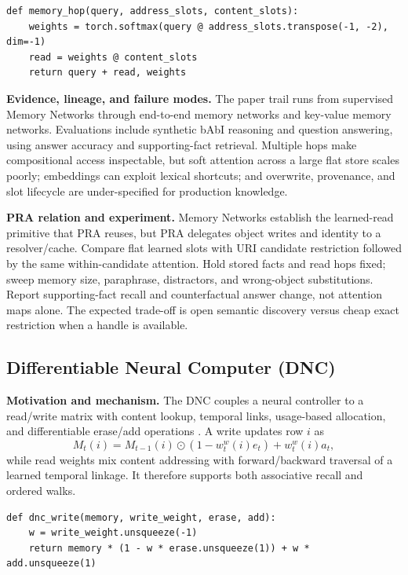 \begin{lstlisting}[caption={One differentiable memory hop}]
def memory_hop(query, address_slots, content_slots):
    weights = torch.softmax(query @ address_slots.transpose(-1, -2), dim=-1)
    read = weights @ content_slots
    return query + read, weights
\end{lstlisting}

\textbf{Evidence, lineage, and failure modes.} The paper trail runs from supervised Memory
Networks through end-to-end memory networks and key-value memory networks.  Evaluations
include synthetic bAbI reasoning and question answering, using answer accuracy and
supporting-fact retrieval.  Multiple hops make compositional access inspectable, but soft
attention across a large flat store scales poorly; embeddings can exploit lexical shortcuts;
and overwrite, provenance, and slot lifecycle are under-specified for production knowledge.

\textbf{PRA relation and experiment.} Memory Networks establish the learned-read primitive
that PRA reuses, but PRA delegates object writes and identity to a resolver/cache.  Compare
flat learned slots with URI candidate restriction followed by the same within-candidate
attention.  Hold stored facts and read hops fixed; sweep memory size, paraphrase, distractors,
and wrong-object substitutions.  Report supporting-fact recall and counterfactual answer
change, not attention maps alone.  The expected trade-off is open semantic discovery versus
cheap exact restriction when a handle is available.

\subsection{Differentiable Neural Computer (DNC)}

\textbf{Motivation and mechanism.} The DNC couples a neural controller to a read/write
matrix with content lookup, temporal links, usage-based allocation, and differentiable
erase/add operations \citep{graves2016dnc}.  A write updates row $i$ as
\begin{equation}
M_t(i)=M_{t-1}(i)\odot(1-w_t^w(i)e_t)+w_t^w(i)a_t,
\end{equation}
while read weights mix content addressing with forward/backward traversal of a learned
temporal linkage.  It therefore supports both associative recall and ordered walks.

\begin{lstlisting}[caption={Core DNC erase/add write; allocation and link updates omitted}]
def dnc_write(memory, write_weight, erase, add):
    w = write_weight.unsqueeze(-1)
    return memory * (1 - w * erase.unsqueeze(1)) + w * add.unsqueeze(1)
\end{lstlisting}


